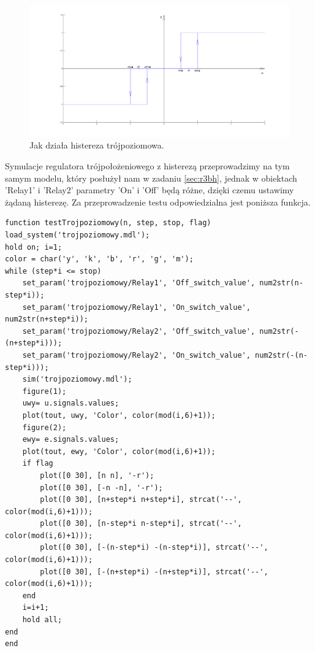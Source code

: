\documentclass[a4paper,10pt]{article}
\begin{document}
\begin{figure}[!h]
    \centering
	\includegraphics[width=120mm]{CW3-histereza-trojpoziomowa.png}
	\caption{Jak działa histereza trójpoziomowa.}
    \label{fig:Rysunek}
\end{figure}

Symulacje regulatora trójpołożeniowego z histerezą przeprowadzimy na tym samym modelu, który posłużył nam w zadaniu \ref{sec:r3bh}, jednak w obiektach 'Relay1' i 'Relay2' parametry 'On' i 'Off' będą różne, dzięki czemu ustawimy żądaną histerezę.
Za przeprowadzenie testu odpowiedzialna jest poniższa funkcja.

\begin{lstlisting}[caption=Funkcja testująca regulator trójpołożeniowy z histerezą.]
function testTrojpoziomowy(n, step, stop, flag)
load_system('trojpoziomowy.mdl');
hold on; i=1;
color = char('y', 'k', 'b', 'r', 'g', 'm');
while (step*i <= stop)
    set_param('trojpoziomowy/Relay1', 'Off_switch_value', num2str(n-step*i));
    set_param('trojpoziomowy/Relay1', 'On_switch_value', num2str(n+step*i));
    set_param('trojpoziomowy/Relay2', 'Off_switch_value', num2str(-(n+step*i)));
    set_param('trojpoziomowy/Relay2', 'On_switch_value', num2str(-(n-step*i)));
    sim('trojpoziomowy.mdl');
    figure(1);
    uwy= u.signals.values;    
    plot(tout, uwy, 'Color', color(mod(i,6)+1));
    figure(2);
    ewy= e.signals.values;    
    plot(tout, ewy, 'Color', color(mod(i,6)+1));
    if flag
        plot([0 30], [n n], '-r');
        plot([0 30], [-n -n], '-r');
        plot([0 30], [n+step*i n+step*i], strcat('--', color(mod(i,6)+1)));
        plot([0 30], [n-step*i n-step*i], strcat('--', color(mod(i,6)+1)));
        plot([0 30], [-(n-step*i) -(n-step*i)], strcat('--', color(mod(i,6)+1)));
        plot([0 30], [-(n+step*i) -(n+step*i)], strcat('--', color(mod(i,6)+1)));
    end
    i=i+1;
    hold all;
end
end
\end{lstlisting}
\end{document}
